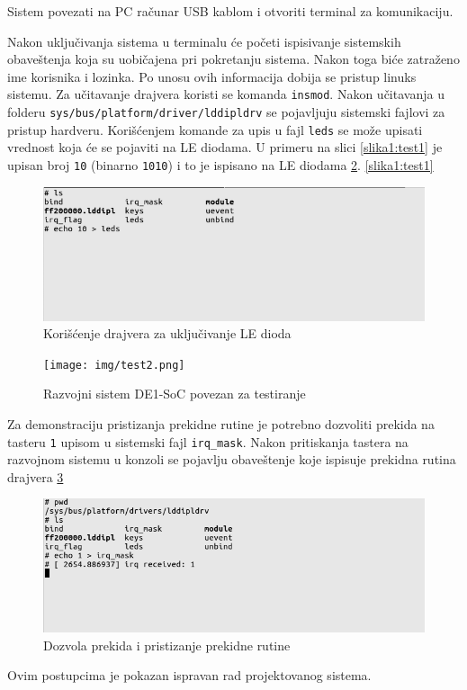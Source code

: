 Sistem povezati na PC računar USB kablom i otvoriti terminal za komunikaciju.

Nakon uključivanja sistema u terminalu će početi ispisivanje sistemskih obaveštenja koja su uobičajena pri pokretanju sistema. Nakon toga biće zatraženo ime korisnika i lozinka. Po unosu ovih informacija dobija se pristup linuks sistemu. Za učitavanje drajvera koristi se komanda \texttt{insmod}. Nakon učitavanja u folderu \texttt{sys/bus/platform/driver/lddipldrv} se pojavljuju sistemski fajlovi za pristup hardveru. Korišćenjem komande za upis u fajl \texttt{leds} se može upisati vrednost koja će se pojaviti na LE diodama. U primeru na slici \ref{slika1:test1} je upisan broj \texttt{10} (binarno \texttt{1010}) i to je ispisano na LE diodama \ref{slika1:test2}.
\ref{slika1:test1}
\begin{figure}[h]
\centering
\includegraphics[scale=0.5]{img/test1.png}
\caption{Korišćenje drajvera za uključivanje LE dioda}
\label{slika1:de1}
\end{figure}
\begin{figure}[h]
\centering
\texttt{[image: img/test2.png]}
\caption{Razvojni sistem DE1-SoC povezan za testiranje}
\label{slika1:test2}
\end{figure}
Za demonstraciju pristizanja prekidne rutine je potrebno dozvoliti prekida na tasteru \texttt{1} upisom u sistemski fajl \texttt{irq\_mask}. Nakon pritiskanja tastera na razvojnom sistemu u konzoli se pojavlju obaveštenje koje ispisuje prekidna rutina drajvera \ref{slika1:test3}\\
\begin{figure}[h]
\centering
\includegraphics[scale=0.5]{img/test3.png}
\caption{Dozvola prekida i pristizanje prekidne rutine}
\label{slika1:test3}
\end{figure}
Ovim postupcima je pokazan ispravan rad projektovanog sistema. \\
\pagebreak
